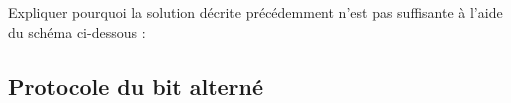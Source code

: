 \documentclass[a4paper,dvipsnames]{article}
\begin{document}
\begin{exercice}{}{}
  Expliquer pourquoi la solution décrite précédemment n'est pas suffisante à l'aide du schéma ci-dessous :  
  \begin{center}
  \end{center}
\end{exercice}

\subsection{Protocole du bit alterné}
\end{document}
